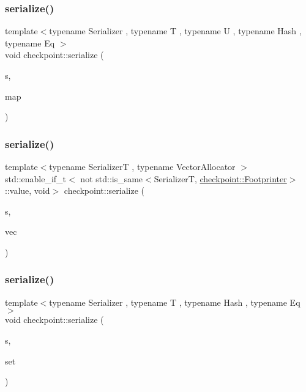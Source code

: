 \subsubsection{\texorpdfstring{serialize()}{serialize()}\hspace{0.1cm}{\footnotesize\ttfamily [24/29]}}
{\footnotesize\ttfamily template$<$typename Serializer , typename T , typename U , typename Hash , typename Eq $>$ \\
void checkpoint\+::serialize (\begin{DoxyParamCaption}\item[{\hyperlink{structcheckpoint_1_1_serializer}{Serializer} \&}]{s,  }\item[{std\+::unordered\+\_\+multimap$<$ T, U, Hash, Eq $>$ \&}]{map }\end{DoxyParamCaption})\hspace{0.3cm}{\ttfamily [inline]}}

\mbox{\label{namespacecheckpoint_a4dbdef848c92782b54888f6247f8e8ba}} 
\subsubsection{\texorpdfstring{serialize()}{serialize()}\hspace{0.1cm}{\footnotesize\ttfamily [25/29]}}
{\footnotesize\ttfamily template$<$typename SerializerT , typename Vector\+Allocator $>$ \\
std\+::enable\+\_\+if\+\_\+t$<$ not std\+::is\+\_\+same$<$SerializerT, \hyperlink{structcheckpoint_1_1_footprinter}{checkpoint\+::\+Footprinter}$>$\+::value, void$>$ checkpoint\+::serialize (\begin{DoxyParamCaption}\item[{SerializerT \&}]{s,  }\item[{std\+::vector$<$ bool, Vector\+Allocator $>$ \&}]{vec }\end{DoxyParamCaption})}

\mbox{\label{namespacecheckpoint_ae4ca8cbc6daf2f5a2a20d44d9fe1cc9f}} 
\subsubsection{\texorpdfstring{serialize()}{serialize()}\hspace{0.1cm}{\footnotesize\ttfamily [26/29]}}
{\footnotesize\ttfamily template$<$typename Serializer , typename T , typename Hash , typename Eq $>$ \\
void checkpoint\+::serialize (\begin{DoxyParamCaption}\item[{\hyperlink{structcheckpoint_1_1_serializer}{Serializer} \&}]{s,  }\item[{std\+::unordered\+\_\+set$<$ T, Hash, Eq $>$ \&}]{set }\end{DoxyParamCaption})\hspace{0.3cm}{\ttfamily [inline]}}

